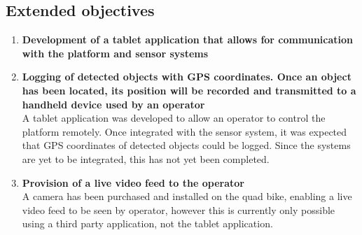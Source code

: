 \documentclass[main.tex]{subfiles}
\begin{document}
\subsection{Extended objectives}
\begin{enumerate}
\item \textbf{Development of a tablet application that allows for communication with the platform and sensor systems}\\ 


\item \textbf{Logging of detected objects with GPS coordinates. Once an object has been located, its position will be recorded and transmitted to a handheld device used by an operator}\\ 
A tablet application was developed to allow an operator to control the platform remotely. Once integrated with the sensor system, it was expected that GPS coordinates of detected objects could be logged. Since the systems are yet to be integrated, this has not yet been completed.  

\item \textbf{Provision of a live video feed to the operator}\\ 
A camera has been purchased and installed on the quad bike, enabling a live video feed to be seen by operator, however this is currently only possible using a third party application, not the tablet application.   


\end{enumerate}
\end{document}
